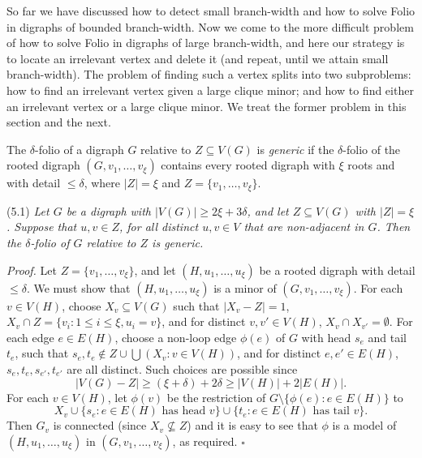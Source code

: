 
So far we have discussed how to detect small branch-width and how to solve Folio in digraphs of bounded branch-width. Now we come to the more difficult problem of how to solve Folio in digraphs of large branch-width, and here our strategy is to locate an irrelevant vertex and delete it (and repeat, until we attain small branch-width). The problem of finding such a vertex splits into two subproblems: how to find an irrelevant vertex given a large clique minor; and how to find either an irrelevant vertex or a large clique minor. We treat the former problem in this section and the next.

The $\delta$-folio of a digraph $G$ relative to $Z \subseteq V(G)$ is \textit{generic} if the $\delta$-folio of the rooted digraph $(G, v_1, \dots, v_{\xi})$ contains every rooted digraph with $\xi$ roots and with detail $\le \delta$, where $|Z| = \xi$ and $Z = \{v_1, \dots, v_{\xi}\}$.

\stmt
(5.1) \textit{Let $G$ be a digraph with $|V(G)| \ge 2\xi + 3\delta$, and let $Z \subseteq V(G)$ with $|Z| = \xi$. Suppose that $u, v \in Z$, for all distinct $u, v \in V$ that are non-adjacent in $G$. Then the $\delta$-folio of $G$ relative to $Z$ is generic.}

\textit{Proof.} Let $Z = \{v_1, \dots, v_{\xi}\}$, and let $(H, u_1, \dots, u_{\xi})$ be a rooted digraph with detail $\le \delta$. We must show that $(H, u_1, \dots, u_{\xi})$ is a minor of $(G, v_1, \dots, v_{\xi})$. For each $v \in V(H)$, choose $X_v \subseteq V(G)$ such that $|X_v - Z| = 1$, $X_v \cap Z = \{v_i : 1 \le i \le \xi, u_i = v\}$, and for distinct $v, v' \in V(H)$, $X_v \cap X_{v'} = \emptyset$. For each edge $e \in E(H)$, choose a non-loop edge $\phi(e)$ of $G$ with head $s_e$ and tail $t_e$, such that $s_e, t_e \notin Z \cup \bigcup(X_v : v \in V(H))$, and for distinct $e, e' \in E(H)$, $s_e, t_e, s_{e'}, t_{e'}$ are all distinct. Such choices are possible since
\begin{equation*}
|V(G) - Z| \ge (\xi + \delta) + 2\delta \ge |V(H)| + 2|E(H)|.
\end{equation*}
For each $v \in V(H)$, let $\phi(v)$ be the restriction of $G \setminus \{\phi(e) : e \in E(H)\}$ to
\begin{equation*}
X_v \cup \{s_e : e \in E(H) \text{ has head } v\} \cup \{t_e : e \in E(H) \text{ has tail } v\}.
\end{equation*}
Then $G_v$ is connected (since $X_v \not\subseteq Z$) and it is easy to see that $\phi$ is a model of $(H, u_1, \dots, u_{\xi})$ in $(G, v_1, \dots, v_{\xi})$, as required. $\square$

